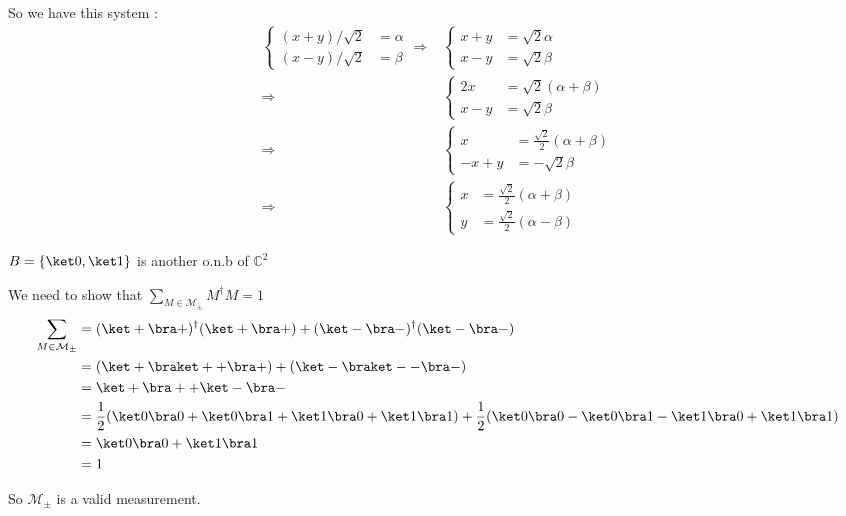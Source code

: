 \begin{itemize}
    So we have this system :
    \begin{align*}
      \begin{cases}
          (x + y) / \sqrt 2 &= \alpha \\
          (x - y) / \sqrt 2 &= \beta
        \end{cases}
      \Rightarrow& \begin{cases}
          x + y &= \sqrt 2 \alpha \\
          x - y &= \sqrt 2 \beta
        \end{cases} \\
      \Rightarrow& \begin{cases}
          2x &= \sqrt 2 (\alpha + \beta) \\
          x - y &= \sqrt 2 \beta
        \end{cases} \\
      \Rightarrow& \begin{cases}
          x &= \frac {\sqrt 2} 2 (\alpha + \beta) \\
          -x + y &= -\sqrt 2 \beta
        \end{cases} \\
      \Rightarrow& \begin{cases}
          x &= \frac {\sqrt 2} 2 (\alpha + \beta) \\
          y &= \frac {\sqrt 2} 2 (\alpha - \beta)
        \end{cases}
      \end{align*}
\end{itemize}

$B = \{\ket 0, \ket 1\}$ is another o.n.b of $\mathbb C^2$

We need to show that $\sum_{M\in\mathcal M_{\pm}} M^\dagger M = 1$
\begin{align*}
  \sum_{M\in\mathcal M_{\pm}} 
  &= (\ket + \bra +)^\dagger (\ket + \bra +) + 
     (\ket - \bra -)^\dagger (\ket - \bra -) \\
  &= (\ket + \braket + + \bra +) + (\ket - \braket - - \bra -)\\
  &= \ket + \bra + + \ket - \bra - \\
  &= \frac 1 2 (\ket 0 \bra 0 + \ket 0 \bra 1 + \ket 1 \bra 0 + \ket 1 \bra 1) +
     \frac 1 2 (\ket 0 \bra 0 - \ket 0 \bra 1 - \ket 1 \bra 0 + \ket 1 \bra 1)
     \\
  &= \ket 0 \bra 0 + \ket 1 \bra 1 \\
  &= 1
\end{align*}

So $\mathcal M_\pm$ is a valid measurement.

